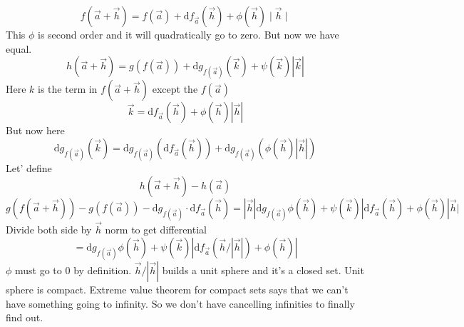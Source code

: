 \documentclass[letter]{article}
\begin{document}
\[
	f(\vec{a}+ \vec{h})  \boxed{
	=
} f(\vec{a}) + \mathrm{d} f_{\vec{a}} (\vec{h}) + \phi(\vec{h}) \mid \vec{h} \mid 
\]
This $\phi$ is second order and it will quadratically go to zero. But now we have equal.
\[
h(\vec{a}+\vec{h}) = 
g(f(\vec{a})) + 
\mathrm{d} g_{f(\vec{a})} 
(\vec{k}) + \psi(\vec{k})|\vec{k}|
\]
Here $k$ is the term in $f(\vec{a}+\vec{h})$ except the $f(\vec{a})$
\[
	\vec{k} = \mathrm{d} f_{\vec{a}} (\vec{h}) + \phi (\vec{h}) |\vec{h}|
\]
But now here 
\[
	\mathrm{d} g_{f(\vec{a})} (\vec{k}) = 
	\mathrm{d} g_{f(\vec{a})} (\mathrm{d} f_{\vec{a}} (\vec{h}) ) + 
	\mathrm{d} g_{f(\vec{a})} (\phi(\vec{h}) |\vec{h}|)
\]
Let' define 
\[
h(\vec{a}+\vec{h}) - h(\vec{a}) 
\] 
\[
	g(f(\vec{a}+\vec{h}) ) - g(f(\vec{a})) - \mathrm{d} g_{f(\vec{a})} \cdot \mathrm{d} f_{\vec{a}} (\vec{h}) = 
	|\vec{h}| \mathrm{d} g_{f(\vec{a})} \phi(\vec{h}) + 
	\psi(\vec{k}) |
	\mathrm{d} f_{\vec{a}} (\vec{h}) + \phi(\vec{h}) |\vec{h}| 
\]
Divide both side by $\vec{h}$ norm to get differential 
\[
	= \mathrm{d} g_{f(\vec{a})} \phi(\vec{h}) + \psi(\vec{k}) 
	| \mathrm{d} f_{\vec{a}} 
	\left(\vec{h}/|\vec{h}| \right) + \phi(\vec{h}) | 
\]
$\phi$ must go to $ 0$ by definition. $\vec{h} / |\vec{h}|$ builds a unit sphere and it's a closed set. Unit sphere is compact. Extreme value theorem for compact sets says that we can't have something going to infinity. So we don't have cancelling infinities to finally find out. 
\end{document}
